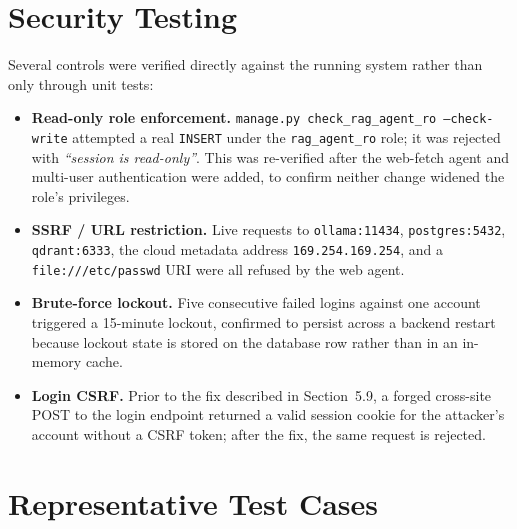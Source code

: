 \documentclass[11pt,a4paper,oneside]{report}
\begin{document}
\section{Security Testing}

Several controls were verified directly against the running system rather
than only through unit tests:

\begin{itemize}[leftmargin=1.5em]
\item \textbf{Read-only role enforcement.} \texttt{manage.py
      check\_rag\_agent\_ro --check-write} attempted a real \texttt{INSERT}
      under the \texttt{rag\_agent\_ro} role; it was rejected with
      \emph{``session is read-only''}. This was re-verified after the
      web-fetch agent and multi-user authentication were added, to confirm
      neither change widened the role's privileges.
\item \textbf{SSRF / URL restriction.} Live requests to
      \texttt{ollama:11434}, \texttt{postgres:5432}, \texttt{qdrant:6333},
      the cloud metadata address \texttt{169.254.169.254}, and a
      \texttt{file:///etc/passwd} URI were all refused by the web agent.
\item \textbf{Brute-force lockout.} Five consecutive failed logins against
      one account triggered a 15-minute lockout, confirmed to persist
      across a backend restart because lockout state is stored on the
      database row rather than in an in-memory cache.
\item \textbf{Login CSRF.} Prior to the fix described in Section~5.9, a
      forged cross-site POST to the login endpoint returned a valid session
      cookie for the attacker's account without a CSRF token; after the
      fix, the same request is rejected.
\end{itemize}

\section{Representative Test Cases}
\end{document}
